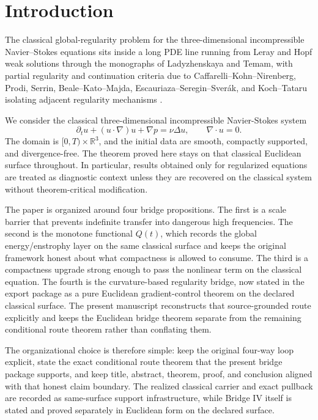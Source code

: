 \section{Introduction}

The classical global-regularity problem for the three-dimensional incompressible Navier--Stokes equations sits inside a long PDE line running from Leray and Hopf weak solutions through the monographs of Ladyzhenskaya and Temam, with partial regularity and continuation criteria due to Caffarelli--Kohn--Nirenberg, Prodi, Serrin, Beale--Kato--Majda, Escauriaza--Seregin--Sver\'ak, and Koch--Tataru isolating adjacent regularity mechanisms \cite{Leray1934,Hopf1951,Ladyzhenskaya1969,Temam2001,CaffarelliKohnNirenberg1982,Prodi1959,Serrin1962,BealeKatoMajda1984,EscauriazaSereginSverak2003,KochTataru2001}.

We consider the classical three-dimensional incompressible Navier-Stokes system
\begin{equation}
\partial_t u + (u\cdot\nabla)u + \nabla p = \nu\Delta u,\qquad \nabla\cdot u = 0.
\end{equation}
The domain is \([0,T)\times\mathbb{R}^3\), and the initial data are smooth, compactly supported, and divergence-free. The theorem proved here stays on that classical Euclidean surface throughout. In particular, results obtained only for regularized equations are treated as diagnostic context unless they are recovered on the classical system without theorem-critical modification.

The paper is organized around four bridge propositions. The first is a scale barrier that prevents indefinite transfer into dangerous high frequencies. The second is the monotone functional \(Q(t)\), which records the global energy/enstrophy layer on the same classical surface and keeps the original framework honest about what compactness is allowed to consume. The third is a compactness upgrade strong enough to pass the nonlinear term on the classical equation. The fourth is the curvature-based regularity bridge, now stated in the export package as a pure Euclidean gradient-control theorem on the declared classical surface. The present manuscript reconstructs that source-grounded route explicitly and keeps the Euclidean bridge theorem separate from the remaining conditional route theorem rather than conflating them.

The organizational choice is therefore simple: keep the original four-way loop explicit, state the exact conditional route theorem that the present bridge package supports, and keep title, abstract, theorem, proof, and conclusion aligned with that honest claim boundary. The realized classical carrier and exact pullback are recorded as same-surface support infrastructure, while Bridge IV itself is stated and proved separately in Euclidean form on the declared surface.
